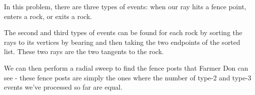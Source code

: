         In this problem, there are three types of events: when our ray hits a fence point, enters a rock, or exits a rock.

    The second and third types of events can be found for each rock by sorting the rays to its vertices by bearing and then taking the two endpoints of the sorted list. These two rays are the two tangents to the rock.
    
    We can then perform a radial sweep to find the fence posts that Farmer Don can see - these fence posts are simply the ones where the number of type-2 and type-3 events we've processed so far are equal.
        
